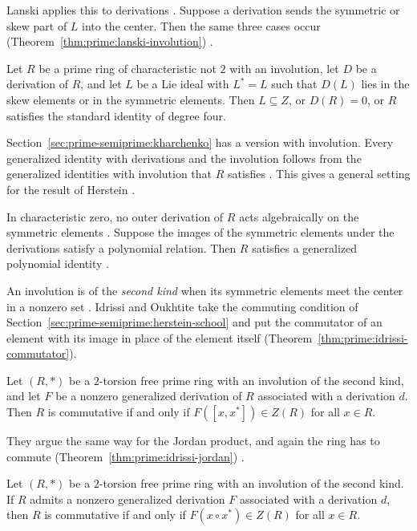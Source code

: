 Lanski applies this to derivations \cite[p.~449]{Lanski1977}. Suppose a
derivation sends the symmetric or skew part of $L$ into the center. Then the same
three cases occur (Theorem~\ref{thm:prime:lanski-involution}) \cite[p.~449]{Lanski1977}.

\begin{theorem}\label{thm:prime:lanski-involution}
Let $R$ be a prime ring of characteristic not $2$ with an involution, let $D$ be
a derivation of $R$, and let $L$ be a Lie ideal with $L^*=L$ such that $D(L)$ lies
in the skew elements or in the symmetric elements. Then $L\subseteq Z$, or
$D(R)=0$, or $R$ satisfies the standard identity of degree four.
\end{theorem}

Section~\ref{sec:prime-semiprime:kharchenko} has a version with involution. Every
generalized identity with derivations and the involution follows from the
generalized identities with involution that $R$ satisfies
\cite[p.~765]{Lanski1985}. This gives a general setting for the result of
Herstein \cite[p.~765]{Lanski1985}.

In characteristic zero, no outer derivation of $R$ acts algebraically on the
symmetric elements \cite[p.~765]{Lanski1985}. Suppose the images of the
symmetric elements under the derivations satisfy a polynomial relation. Then
$R$ satisfies a generalized polynomial identity \cite[p.~765]{Lanski1985}.

An involution is of the \emph{second kind} when its symmetric elements meet the
center in a nonzero set \cite[p.~1950001-1]{Idrissi2019}. Idrissi and Oukhtite
take the commuting condition of
Section~\ref{sec:prime-semiprime:herstein-school} and put the commutator of an
element with its image in place of the element itself
\cite[p.~1950001-4]{Idrissi2019} (Theorem~\ref{thm:prime:idrissi-commutator}).

\begin{theorem}\label{thm:prime:idrissi-commutator}
Let $(R,*)$ be a $2$-torsion free prime ring with an involution of the second kind,
and let $F$ be a nonzero generalized derivation of $R$ associated with a derivation
$d$. Then $R$ is commutative if and only if $F([x,x^{*}])\in Z(R)$ for all $x\in R$.
\end{theorem}

They argue the same way for the Jordan product, and again the ring has to commute (Theorem~\ref{thm:prime:idrissi-jordan})
\cite[p.~1950001-6]{Idrissi2019}.\begin{theorem}\label{thm:prime:idrissi-jordan}
Let $(R,*)$ be a $2$-torsion free prime ring with an involution of the second kind.
If $R$ admits a nonzero generalized derivation $F$ associated with a derivation $d$,
then $R$ is commutative if and only if $F(x\circ x^{*})\in Z(R)$ for all $x\in R$.
\end{theorem}

